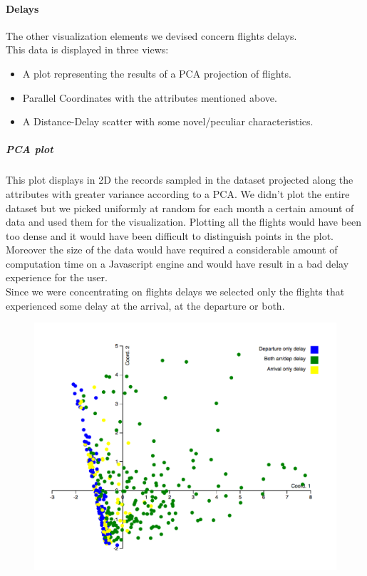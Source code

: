 \documentclass[a4paper, 12pt]{article}
\begin{document}
\paragraph*{Delays}
The other visualization elements we devised concern flights delays.
\\
This data is displayed in three views:
\begin{itemize}
\item A plot representing the results of a PCA projection of flights.
\item Parallel Coordinates with the attributes mentioned above.
\item A Distance-Delay scatter with some novel/peculiar characteristics.
\end{itemize}


\subparagraph{PCA plot} 
This plot displays in 2D the records sampled in the dataset projected along the attributes
with greater variance according to a PCA. We didn't plot the entire dataset but we picked uniformly
at random for each month a certain amount of data and used them for the visualization. Plotting all
the flights would have been too dense and it would have been difficult to distinguish points in the
plot. Moreover the size of the data would have required a considerable amount of computation time
on a Javascript engine and would have result in a bad delay experience for the user.
\\
Since we were concentrating on flights delays we selected only the flights that experienced some delay
at the arrival, at the departure or both.
\\
\begin{figure}
\includegraphics[scale=0.7]{pca.PNG}
\end{figure}
\end{document}
